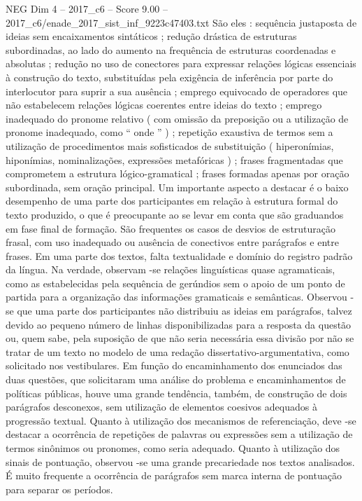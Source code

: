 \begin{textsample}{NEG Dim 4 – 2017\_c6 – Score 9.00 – 2017\_c6/enade\_2017\_sist\_inf\_9223c47403.txt}
São eles : sequência justaposta de ideias sem encaixamentos sintáticos ; redução drástica de estruturas subordinadas, ao lado do aumento na frequência de estruturas coordenadas e absolutas ; redução no uso de conectores para expressar relações lógicas essenciais à construção do texto, substituídas pela exigência de inferência por parte do interlocutor para suprir a sua ausência ; emprego equivocado de operadores que não estabelecem relações lógicas coerentes entre ideias do texto ; emprego inadequado do pronome relativo ( com omissão da preposição ou a utilização de pronome inadequado, como “ onde ” ) ; repetição exaustiva de termos sem a utilização de procedimentos mais sofisticados de substituição ( hiperonímias, hiponímias, nominalizações, expressões metafóricas ) ; frases fragmentadas que comprometem a estrutura lógico-gramatical ; frases formadas apenas por oração subordinada, sem oração principal.
Um importante aspecto a destacar é o baixo desempenho de uma parte dos participantes em relação à estrutura formal do texto produzido, o que é preocupante ao se levar em conta que são graduandos em fase final de formação.
São frequentes os casos de desvios de estruturação frasal, com uso inadequado ou ausência de conectivos entre parágrafos e entre frases.
Em uma parte dos textos, falta textualidade e domínio do registro padrão da língua.
Na verdade, observam -se relações linguísticas quase agramaticais, como as estabelecidas pela sequência de gerúndios sem o apoio de um ponto de partida para a organização das informações gramaticais e semânticas.
Observou -se que uma parte dos participantes não distribuiu as ideias em parágrafos, talvez devido ao pequeno número de linhas disponibilizadas para a resposta da questão ou, quem sabe, pela suposição de que não seria necessária essa divisão por não se tratar de um texto no modelo de uma redação dissertativo-argumentativa, como solicitado nos vestibulares.
Em função do encaminhamento dos enunciados das duas questões, que solicitaram uma análise do problema e encaminhamentos de políticas públicas, houve uma grande tendência, também, de construção de dois parágrafos desconexos, sem utilização de elementos coesivos adequados à progressão textual.
Quanto à utilização dos mecanismos de referenciação, deve -se destacar a ocorrência de repetições de palavras ou expressões sem a utilização de termos sinônimos ou pronomes, como seria adequado.
Quanto à utilização dos sinais de pontuação, observou -se uma grande precariedade nos textos analisados.
É muito frequente a ocorrência de parágrafos sem marca interna de pontuação para separar os períodos.

\end{textsample}
